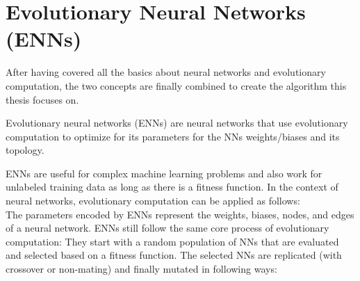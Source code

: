 \documentclass[11pt]{report}
\newcommand{\mydeflabel}{}
\newenvironment{mydef}[1]
{\renewcommand\mydeflabel{#1}\begin{mydefinner}}
{\end{mydefinner}}
\begin{document}
    \section{Evolutionary Neural Networks (ENNs)}\label{sec:evolutionary-neural-networks-(enns)}
    After having covered all the basics about neural networks and evolutionary computation, the two concepts are finally combined to create the algorithm this thesis focuses on.
    \begin{mydef}{Evolutionary Neural Networks}
        Evolutionary neural networks (ENNs) are neural networks that use evolutionary computation to optimize for its parameters for the NNs weights/biases and its topology.
    \end{mydef}
    ENNs are useful for complex machine learning problems and also work for unlabeled training data as long as there is a fitness function.
    In the context of neural networks, evolutionary computation can be applied as follows:
    \\
    The parameters encoded by ENNs represent the weights, biases, nodes, and edges of a neural network.
    ENNs still follow the same core process of evolutionary computation:
    They start with a random population of NNs that are evaluated and selected based on a fitness function.
    The selected NNs are replicated (with crossover or non-mating) and finally mutated in following ways:
\end{document}
